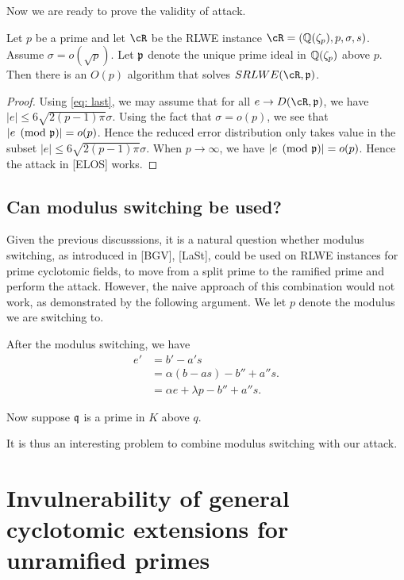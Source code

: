 \documentclass{amsart}
\begin{document}
Now we are ready to prove the validity of attack.
\begin{theorem}
Let $p$ be a prime and let $\cR$ be the RLWE instance $\cR = (\bQ(\zeta_p), p, \sigma,s)$.
Assume $\sigma = o(\sqrt{p})$. Let $\mathfrak{p}$ denote the unique prime ideal in $\mathbb{Q}(\zeta_p)$ above $p$. Then there is an $O(p)$ algorithm that solves $SRLWE(\cR,\fp)$.
\end{theorem}

\begin{proof}
Using \ref{eq: last}, we may assume that for all $e \to D(\cR,\fp)$, we have $|e|\leq 6\sqrt{2(p-1)\pi} \sigma$. Using the fact that $\sigma = o(p)$, we see that $|e \pmod{\mathfrak{p}}| = o(p)$. Hence the reduced error distribution only takes value in the subset
$|e|\leq 6\sqrt{2(p-1)\pi} \sigma$. When $p \to \infty$, we have $|e \pmod {\mathfrak{p}}| = o(p)$.  Hence the attack in [ELOS] works.
\end{proof}

\subsection{Can modulus switching be used?}

Given the previous discusssions, it is a natural question whether modulus switching, as introduced in [BGV], [LaSt],
could be used on RLWE instances for prime cyclotomic fields, to move from a split prime to the ramified prime and perform the attack. However, the naive approach of this combination would not work, as demonstrated by the following argument.
We let $p$ denote the modulus we are switching to.

After the modulus switching, we have
\begin{align*}
    e' &= b' - a's  \\
    &= \alpha(b-as) - b''  + a''s. \\
    & = \alpha e + \lambda p - b'' + a''s.
\end{align*}

Now suppose $\mathfrak{q}$ is a prime in $K$ above $q$.





It is thus an interesting problem to combine modulus switching with our attack.

\section{Invulnerability of general cyclotomic extensions for unramified primes}
\label{sec: cyclo-secure}
\end{document}
